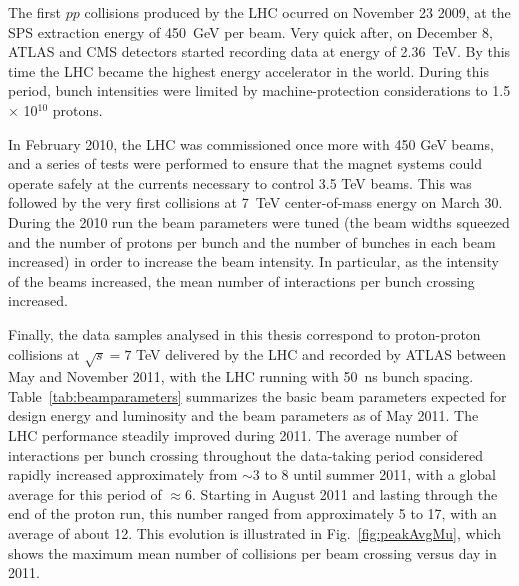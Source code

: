 The first $pp$ collisions produced by the LHC ocurred on November 23 2009, at the SPS extraction energy of 450~GeV per beam. Very quick after, on December 8, ATLAS and CMS detectors started recording data at energy of 2.36~TeV. By this time the LHC became the highest energy accelerator in the world.  During this period, bunch intensities were limited by machine-protection considerations to 1.5 $\times$ 10$^{10}$ protons.

 In February 2010, the LHC was commissioned once more with 450 GeV beams, and a series of tests were performed to ensure that the magnet systems could operate safely at the currents necessary to control 3.5 TeV beams. This was followed by the very first collisions at 7~TeV center-of-mass energy on March 30. During the 2010 run the beam parameters were tuned (the beam widths squeezed and the number of protons per bunch and the number of bunches in each beam increased) in order to increase the beam intensity.  In particular, as the intensity of the beams increased, the mean number of interactions per bunch crossing increased.  


Finally, the data samples analysed in this thesis correspond to proton-proton collisions at $\sqrt{s}=7$ TeV delivered by the LHC and recorded by ATLAS between May and November 2011, with the LHC running with 50~ns bunch spacing. Table~\ref{tab:beamparameters} summarizes the basic beam parameters expected for design energy and luminosity and the beam parameters as of May 2011. The LHC performance steadily improved during 2011. The average number of interactions per bunch crossing throughout the data-taking period considered rapidly increased approximately from $\sim$3 to 8 until summer 2011, with a global average for this period of $\approx 6$. Starting in August 2011 and lasting through the end of the proton run, this number ranged from approximately 5 to 17, with an average of about 12. This evolution is illustrated in Fig.~\ref{fig:peakAvgMu}, which shows the maximum mean number of collisions per beam crossing versus day in 2011. 

